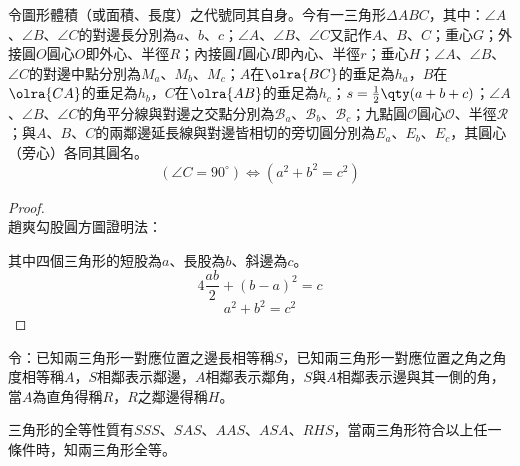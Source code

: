 \documentclass[a4paper,12pt]{report}
\begin{document}
令圖形體積（或面積、長度）之代號同其自身。今有一三角形$\Delta ABC$，其中：$\angle A$、$\angle B$、$\angle C$的對邊長分別為$a$、$b$、$c$；$\angle A$、$\angle B$、$\angle C$又記作$A$、$B$、$C$；重心$G$；外接圓$O$圓心$O$即外心、半徑$R$；內接圓$I$圓心$I$即內心、半徑$r$；垂心$H$；$\angle A$、$\angle B$、$\angle C$的對邊中點分別為$M_a$、$M_b$、$M_c$；$A$在$\olra{BC}$的垂足為$h_a$，$B$在$\olra{CA}$的垂足為$h_b$，$C$在$\olra{AB}$的垂足為$h_c$；$s=\frac{1}{2}\qty(a+b+c)$；$\angle A$、$\angle B$、$\angle C$的角平分線與對邊之交點分別為$\mathscr{B}_a$、$\mathscr{B}_b$、$\mathscr{B}_c$；九點圓$\mathscr{O}$圓心$\mathscr{O}$、半徑$\mathscr{R}$；與$A$、$B$、$C$的兩鄰邊延長線與對邊皆相切的旁切圓分別為$E_a$、$E_b$、$E_c$，其圓心（旁心）各同其圓名。
\[(\angle C=90^\circ)\iff (a^2+b^2=c^2)\]
\begin{proof}\mbox{}\\
趙爽勾股圓方圖證明法：
\begin{center}
\end{center}
其中四個三角形的短股為$a$、長股為$b$、斜邊為$c$。
\[4\frac{ab}{2}+(b-a)^2=c\]
\[a^2+b^2=c^2\]
\end{proof}
令：已知兩三角形一對應位置之邊長相等稱$S$，已知兩三角形一對應位置之角之角度相等稱$A$，$S$相鄰表示鄰邊，$A$相鄰表示鄰角，$S$與$A$相鄰表示邊與其一側的角，當$A$為直角得稱$R$，$R$之鄰邊得稱$H$。

三角形的全等性質有$SSS$、$SAS$、$AAS$、$ASA$、$RHS$，當兩三角形符合以上任一條件時，知兩三角形全等。
\end{document}
